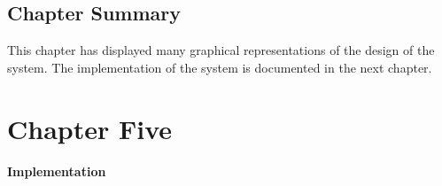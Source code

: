 \documentclass[12pt,a4paper]{article}
\begin{document}
\begin{comment}
\subsection{Flow Charts}
	A flow chart is a diagram used to represent the process flow of an algorithm, problem or some transaction
within a business. Therefore a flow chart (Figure \ref{fig:flowchart}) was used to graphically represent the process
flow of an order.
\begin{figure}[H]
		\centering
		\texttt{[image: /home/basedul/Documents/Report-writing-using-latex/ResturentManagementSystemReport/flowchart.png]}
		\caption{Flow chart to show the flow of events of an order..}
		\label{fig:flowchart} 
\end{figure}
\end{comment}

\subsection{Chapter Summary}
	This chapter has displayed many graphical representations of the design of the system. The implementation of the system is documented in the next chapter.
\newpage
\section{Chapter Five}
{\bfseries \Large Implementation}
\end{document}
